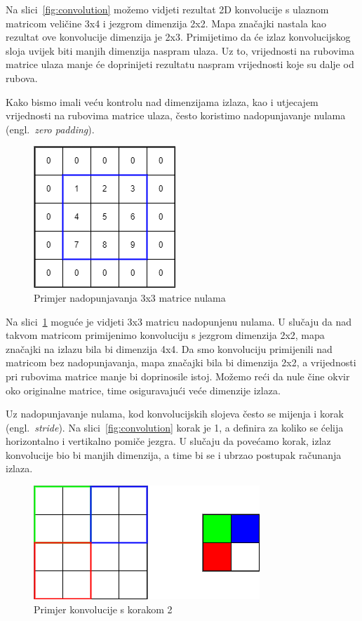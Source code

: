 \documentclass[times, utf8, zavrsni, numeric]{fer}
\begin{document}
Na slici~\ref{fig:convolution} možemo vidjeti rezultat 2D konvolucije s ulaznom matricom veličine 3x4 i jezgrom dimenzija 2x2. 
Mapa značajki nastala kao rezultat ove konvolucije dimenzija je 2x3. Primijetimo da će izlaz konvolucijskog sloja uvijek biti manjih dimenzija naspram ulaza.
Uz to, vrijednosti na rubovima matrice ulaza manje će doprinijeti rezultatu naspram vrijednosti koje su dalje od rubova.

Kako bismo imali veću kontrolu nad dimenzijama izlaza, kao i utjecajem vrijednosti na rubovima matrice ulaza, često koristimo nadopunjavanje nulama (engl.\ \textit{zero padding}).

\begin{figure}[htb]
    \centering
    \includegraphics[scale=0.5]{zero_padding.png}
    \caption{Primjer nadopunjavanja 3x3 matrice nulama}
    \label{fig:zero_padding}
\end{figure}

Na slici~\ref{fig:zero_padding} moguće je vidjeti 3x3 matricu nadopunjenu nulama. U slučaju da nad takvom matricom primijenimo konvoluciju s jezgrom dimenzija 2x2, mapa značajki na izlazu bila bi dimenzija 4x4.
Da smo konvoluciju primijenili nad matricom bez nadopunjavanja, mapa značajki bila bi dimenzija 2x2, a vrijednosti pri rubovima matrice manje bi doprinosile istoj.
Možemo reći da nule čine okvir oko originalne matrice, time osiguravajući veće dimenzije izlaza.

\pagebreak

Uz nadopunjavanje nulama, kod konvolucijskih slojeva često se mijenja i korak (engl.\ \textit{stride}). 
Na slici~\ref{fig:convolution} korak je 1, a definira za koliko se ćelija horizontalno i vertikalno pomiče jezgra. 
U slučaju da povećamo korak, izlaz konvolucije bio bi manjih dimenzija, a time bi se i ubrzao postupak računanja izlaza.
\begin{figure}[htb]
    \centering
    \includegraphics[scale=0.5]{stride.png}
    \caption{Primjer konvolucije s korakom 2}
    \label{fig:stride}
\end{figure}
\end{document}
